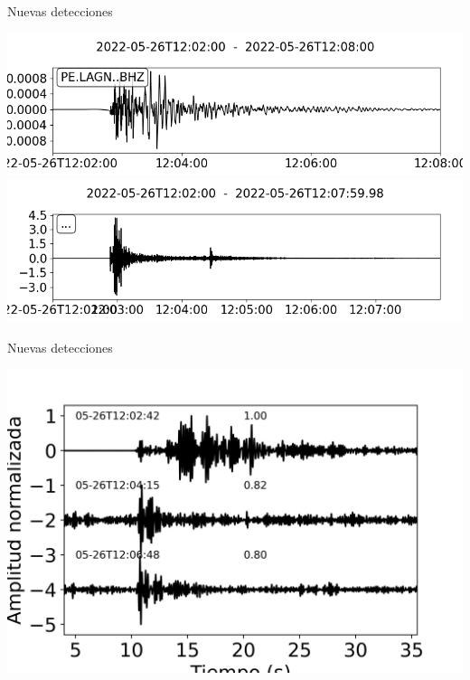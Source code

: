 \documentclass{beamer}
\begin{document}
\begin{frame}
 {Nuevas detecciones}

 \includegraphics[width=1\linewidth]{images/earthquake1.png} 
 \pause
 \includegraphics[width=1\linewidth]{images/earthquake2.png}
 
\end{frame}


\begin{frame}
 {Nuevas detecciones}

 \includegraphics[width=1\linewidth]{images/detections.png} 
 
\end{frame}
\end{document}
